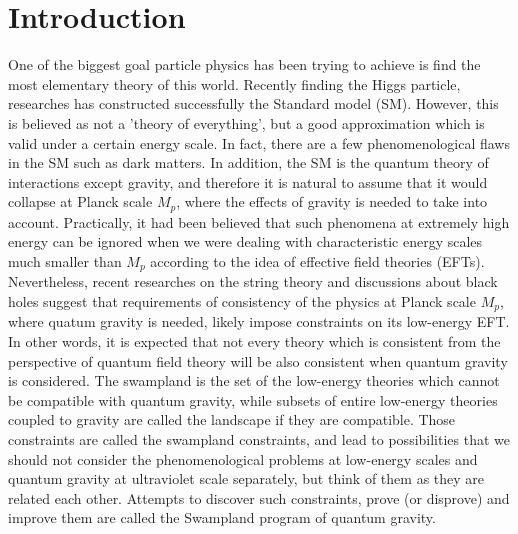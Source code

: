 \chapter{Introduction}
\label{Introduction}

One of the biggest goal particle physics has been trying to achieve is find the most elementary theory of this world. Recently finding the Higgs particle, researches has constructed successfully the Standard model (SM). However, this is believed as not a 'theory of everything', but a good approximation which is valid under a certain energy scale. In fact, there are a few phenomenological flaws in the SM such as dark matters. In addition, the SM is the quantum theory of interactions except gravity, and therefore it is natural to assume that it would collapse at Planck scale $M_{p}$, where the effects of gravity is needed to take into account. Practically, it had been believed that such phenomena at extremely high energy can be ignored when we were dealing with characteristic energy scales much smaller than $M_{p}$ according to the idea of effective field theories (EFTs). \\
\indent Nevertheless, recent researches on the string theory and discussions about black holes suggest that requirements of consistency of the physics at Planck scale $M_{p}$, where quatum gravity is needed, likely impose constraints on its low-energy EFT. In other words, it is expected that not every theory which is consistent from the perspective of quantum field theory will be also consistent when quantum gravity is considered. The swampland is the set of the low-energy theories which cannot be compatible with quantum gravity, while subsets of entire low-energy theories coupled to gravity are called the landscape if they are compatible. Those constraints are called the swampland constraints, and lead to possibilities that we should not consider the phenomenological problems at low-energy scales and quantum gravity at ultraviolet scale separately, but think of them as they are related each other. Attempts to discover such constraints, prove (or disprove) and improve them are called the Swampland program of quantum gravity. \\
